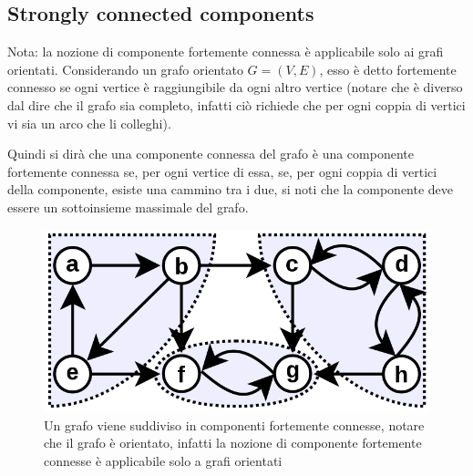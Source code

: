 \documentclass[12pt,a4paper]{article}
\begin{document}
\subsection{Strongly connected components}
Nota: la nozione di componente fortemente connessa è applicabile solo ai grafi orientati.
Considerando un grafo orientato $G = (V, E)$, esso è detto fortemente connesso se ogni vertice è raggiungibile da ogni altro vertice (notare che è diverso dal dire che il grafo sia completo, infatti ciò richiede che per ogni coppia di vertici vi sia un arco che li colleghi).

Quindi si dirà che una componente connessa del grafo è una componente fortemente connessa se, per ogni vertice di essa, se, per ogni coppia di vertici della componente, esiste una cammino tra i due, si noti che la componente deve essere un sottoinsieme massimale del grafo.
\begin{figure}[h]
	\centering
	\includegraphics[width=0.5\linewidth]{img/Scc-1.svg.png}
	\caption{Un grafo viene suddiviso in componenti fortemente connesse, notare che il grafo è orientato, infatti la nozione di componente fortemente connesse è applicabile solo a grafi orientati}
	\label{fig:scc}
\end{figure}
\end{document}
